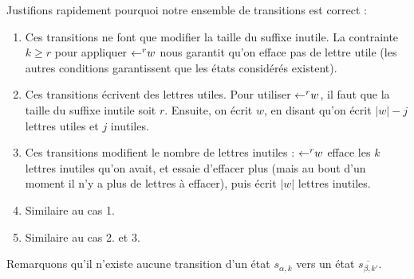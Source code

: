 \documentclass[12pt, a4paper]{article}
\renewcommand{\bar}{\overline}
\begin{document}
    Justifions rapidement pourquoi notre ensemble de transitions est correct :
    \begin{enumerate}
        \item Ces transitions ne font que modifier la taille du suffixe inutile. La contrainte $k \geqslant r$ pour appliquer $\mathord{\leftarrow}^r w$ nous garantit qu'on efface pas de lettre utile (les autres conditions garantissent que les états considérés existent).
        \item Ces transitions écrivent des lettres utiles. Pour utiliser $\mathord{\leftarrow}^r w$, il faut que la taille du suffixe inutile soit $r$. Ensuite, on écrit $w$, en disant qu'on écrit $|w|-j$ lettres utiles et $j$ inutiles.
        \item Ces transitions modifient le nombre de lettres inutiles : $\mathord{\leftarrow}^r w$ efface les $k$ lettres inutiles qu'on avait, et essaie d'effacer plus (mais au bout d'un moment il n'y a plus de lettres à effacer), puis écrit $|w|$ lettres inutiles.
        \item Similaire au cas 1.
        \item Similaire au cas 2. et 3.
    \end{enumerate}
    Remarquons qu'il n'existe aucune transition d'un état $s_{\alpha, k}$ vers un état $\bar{s_{\beta, k'}}$.
\end{document}
